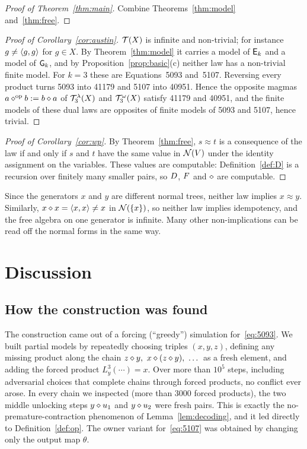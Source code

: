 \begin{proof}[Proof of Theorem~\ref{thm:main}]
Combine Theorems~\ref{thm:model} and~\ref{thm:free}.
\end{proof}

\begin{proof}[Proof of Corollary~\ref{cor:austin}]
$\mathcal{T}(X)$ is infinite and non-trivial; for instance $g\neq\langle g,g\rangle$ for $g\in X$.
By Theorem~\ref{thm:model} it carries a model of $\mathsf{E}_{k}$ and a model of $\mathsf{G}_{k}$,
and by Proposition~\ref{prop:basic}(c) neither law has a non-trivial finite
model. For $k=3$ these are Equations~5093 and~5107. Reversing every product
turns 5093 into 41179 and 5107 into 40951. Hence the opposite magmas
$a\mathbin{\diamond}^{\rm op}b:=b\mathbin{\diamond} a$ of $\mathcal{T}_3^\lambda(X)$ and $\mathcal{T}_3^\omega(X)$ satisfy 41179
and 40951, and the finite models of these dual laws are opposites of finite
models of 5093 and 5107, hence trivial.
\end{proof}

\begin{proof}[Proof of Corollary~\ref{cor:wp}]
By Theorem~\ref{thm:free}, $s\approx t$ is a consequence of the law if and only
if $s$ and $t$ have the same value in $\mathcal{N}(V)$ under the identity assignment on
the variables. These values are computable: Definition~\ref{def:D} is a
recursion over finitely many smaller pairs, so $D$, $F$ and $\mathbin{\diamond}$ are
computable.
\end{proof}

\begin{remark}
Since the generators $x$ and $y$ are different normal trees, neither law
implies $x\approx y$. Similarly, $x\mathbin{\diamond} x=\langle x,x\rangle\ne x$ in $\mathcal{N}(\{x\})$, so
neither law implies idempotency, and the free algebra on one generator is
infinite. Many other non-implications can be read off the normal forms in the
same way.
\end{remark}

\section{Discussion}\label{sec:discussion}

\subsection{How the construction was found}
The construction came out of a forcing (``greedy'') simulation for~\eqref{eq:5093}.
We built partial models by repeatedly choosing triples $(x,y,z)$, defining any
missing product along the chain $z\mathbin{\diamond} y,\ x\mathbin{\diamond}(z\mathbin{\diamond} y),\ \dots$ as a fresh
element, and adding the forced product $L_y^{3}(\cdots)=x$. Over more than
$10^5$ steps, including adversarial choices that complete chains through forced
products, no conflict ever arose. In every chain we inspected (more than 3000
forced products), the two middle unlocking steps $y\mathbin{\diamond} u_1$ and $y\mathbin{\diamond} u_2$ were
fresh pairs. This is exactly the no-premature-contraction phenomenon of
Lemma~\ref{lem:decoding}, and it led directly to Definition~\ref{def:op}. The
owner variant for~\eqref{eq:5107} was obtained by changing only the output
map $\theta$.

